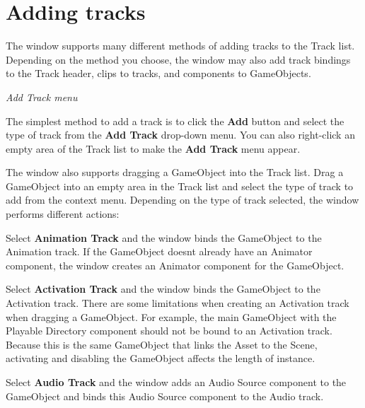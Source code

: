 \chapter{Adding tracks}
\hypertarget{md__hey_tea_9_2_library_2_package_cache_2com_8unity_8timeline_0d1_87_85_2_documentation_0i_2trk__add}{}\label{md__hey_tea_9_2_library_2_package_cache_2com_8unity_8timeline_0d1_87_85_2_documentation_0i_2trk__add}
\label{md__hey_tea_9_2_library_2_package_cache_2com_8unity_8timeline_0d1_87_85_2_documentation_0i_2trk__add_autotoc_md4756}%
%
 The  window supports many different methods of adding tracks to the Track list. Depending on the method you choose, the  window may also add track bindings to the Track header, clips to tracks, and components to Game\+Objects.



{\itshape Add Track menu}

The simplest method to add a track is to click the {\bfseries{Add}} button and select the type of track from the {\bfseries{Add Track}} drop-\/down menu. You can also right-\/click an empty area of the Track list to make the {\bfseries{Add Track}} menu appear.

The  window also supports dragging a Game\+Object into the Track list. Drag a Game\+Object into an empty area in the Track list and select the type of track to add from the context menu. Depending on the type of track selected, the  window performs different actions\+:


\begin{DoxyItemize}
\item Select {\bfseries{Animation Track}} and the  window binds the Game\+Object to the Animation track. If the Game\+Object doesn\textquotesingle{}t already have an Animator component, the  window creates an Animator component for the Game\+Object.
\item Select {\bfseries{Activation Track}} and the  window binds the Game\+Object to the Activation track. There are some limitations when creating an Activation track when dragging a Game\+Object. For example, the main Game\+Object with the Playable Directory component should not be bound to an Activation track. Because this is the same Game\+Object that links the  Asset to the Scene, activating and disabling the Game\+Object affects the length of  instance.
\item Select {\bfseries{Audio Track}} and the  window adds an Audio Source component to the Game\+Object and binds this Audio Source component to the Audio track. 
\end{DoxyItemize}
